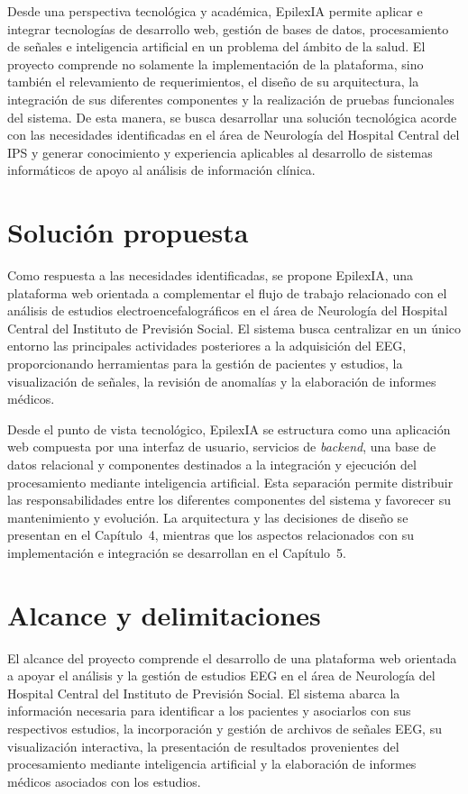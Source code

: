 Desde una perspectiva tecnológica y académica, EpilexIA permite aplicar e
integrar tecnologías de desarrollo web, gestión de bases de datos,
procesamiento de señales e inteligencia artificial en un problema del ámbito
de la salud. El proyecto comprende no solamente la implementación de la
plataforma, sino también el relevamiento de requerimientos, el diseño
de su arquitectura, la integración de sus diferentes componentes
y la realización de pruebas funcionales del sistema. De esta manera, se busca desarrollar una solución tecnológica acorde con las necesidades identificadas en el área de Neurología del Hospital Central del IPS y generar conocimiento y experiencia aplicables al desarrollo de sistemas informáticos
de apoyo al análisis de información clínica.

\section{Solución propuesta}
\label{sec:solucion-propuesta}

Como respuesta a las necesidades identificadas, se propone EpilexIA, una
plataforma web orientada a complementar el flujo de trabajo relacionado con
el análisis de estudios electroencefalográficos en el área de Neurología del
Hospital Central del Instituto de Previsión Social. El sistema busca
centralizar en un único entorno las principales actividades posteriores a la
adquisición del EEG, proporcionando herramientas para la gestión de pacientes
y estudios, la visualización de señales, la revisión de anomalías y la
elaboración de informes médicos.

Desde el punto de vista tecnológico, EpilexIA se estructura como una
aplicación web compuesta por una interfaz de usuario, servicios de \textit{backend},
una base de datos relacional y componentes destinados a la integración y
ejecución del procesamiento mediante inteligencia artificial. Esta separación
permite distribuir las responsabilidades entre los diferentes componentes
del sistema y favorecer su mantenimiento y evolución. La arquitectura y las
decisiones de diseño se presentan en el Capítulo~4, mientras que los aspectos
relacionados con su implementación e integración se desarrollan en el
Capítulo~5.

\section{Alcance y delimitaciones}
\label{sec:alcance}

El alcance del proyecto comprende el desarrollo de una plataforma web
orientada a apoyar el análisis y la gestión de estudios EEG en el área de
Neurología del Hospital Central del Instituto de Previsión Social. El sistema
abarca la información necesaria para identificar a los pacientes y asociarlos
con sus respectivos estudios, la incorporación y gestión de archivos de
señales EEG, su visualización interactiva, la presentación de resultados
provenientes del procesamiento mediante inteligencia artificial y la
elaboración de informes médicos asociados con los estudios.

